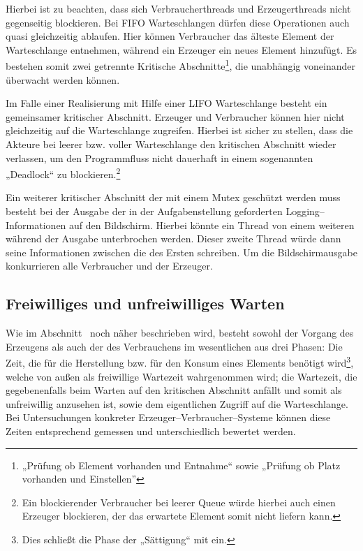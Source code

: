 Hierbei ist zu beachten, dass sich Verbraucherthreads und Erzeugerthreads nicht gegenseitig blockieren. Bei \ac{FIFO} Warteschlangen dürfen diese Operationen auch quasi gleichzeitig ablaufen. Hier können Verbraucher das älteste Element der Warteschlange entnehmen, während ein Erzeuger ein neues Element hinzufügt. Es bestehen somit zwei getrennte Kritische Abschnitte\footnote{„Prüfung ob Element vorhanden und Entnahme“ sowie „Prüfung ob Platz vorhanden und Einstellen”}, die unabhängig voneinander überwacht werden können.

Im Falle einer Realisierung mit Hilfe einer \ac{LIFO} Warteschlange besteht ein gemeinsamer kritischer Abschnitt. Erzeuger und Verbraucher können hier nicht gleichzeitig auf die Warteschlange zugreifen. Hierbei ist sicher zu stellen, dass die Akteure bei leerer bzw. voller Warteschlange den kritischen Abschnitt wieder verlassen, um den Programmfluss nicht dauerhaft in einem sogenannten „Deadlock“ zu blockieren.\footnote{Ein blockierender Verbraucher bei leerer Queue würde hierbei auch einen Erzeuger blockieren, der das erwartete Element somit nicht liefern kann.}

Ein weiterer kritischer Abschnitt der mit einem Mutex geschützt werden muss besteht bei der Ausgabe der in der Aufgabenstellung geforderten Logging–Informationen auf den Bildschirm. Hierbei könnte ein Thread von einem weiteren während der Ausgabe unterbrochen werden. Dieser zweite Thread würde dann seine Informationen zwischen die des Ersten schreiben. Um die Bildschirmausgabe konkurrieren alle Verbraucher und der Erzeuger.

\subsection{Freiwilliges und unfreiwilliges Warten} %
\label{sub:freiwilliges_und_unfreiwilliges_warten}

Wie im Abschnitt~ noch näher beschrieben wird, besteht sowohl der Vorgang des Erzeugens als auch der des Verbrauchens im wesentlichen aus drei Phasen: Die Zeit, die für die Herstellung bzw. für den Konsum eines Elements benötigt wird\footnote{Dies schließt die Phase der „Sättigung“ mit ein.}, welche von außen als freiwillige Wartezeit wahrgenommen wird; die Wartezeit, die gegebenenfalls beim Warten auf den kritischen Abschnitt anfällt und somit als unfreiwillig anzusehen ist, sowie dem eigentlichen Zugriff auf die Warteschlange. Bei Untersuchungen konkreter Erzeuger–Verbraucher–Systeme können diese Zeiten entsprechend gemessen und unterschiedlich bewertet werden.

